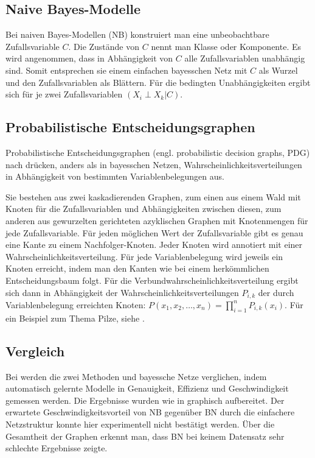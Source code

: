 \documentclass[a4paper,10pt,oneside]{scrartcl}
\begin{document}
\subsection*{Naive Bayes-Modelle}

Bei naiven Bayes-Modellen (NB) konstruiert man eine unbeobachtbare Zufallsvariable $C$. Die Zustände von $C$ nennt man Klasse oder Komponente. 
Es wird angenommen, dass in Abhängigkeit von $C$ alle Zufallsvariablen unabhängig sind. Somit entsprechen sie einem einfachen bayesschen Netz mit $C$ als Wurzel und den Zufallsvariablen als Blättern. Für die bedingten Unabhängigkeiten ergibt sich für je zwei Zufallsvariablen $(X_i \perp X_k | C)$. 

\subsection*{Probabilistische Entscheidungsgraphen}

Probabilistische Entscheidungsgraphen (engl. probabilistic decision graphs, PDG) nach \cite{bozga1999representation} drücken, anders als in bayesschen Netzen, Wahrscheinlichkeitsverteilungen in Abhängigkeit von bestimmten Variablenbelegungen aus.

Sie bestehen aus zwei kaskadierenden Graphen, zum einen aus einem Wald mit Knoten für die Zufallsvariablen und Abhängigkeiten zwischen diesen, zum anderen aus gewurzelten gerichteten azyklischen Graphen mit Knotenmengen für jede Zufallsvariable. Für jeden möglichen Wert der Zufallsvariable gibt es genau eine Kante zu einem Nachfolger-Knoten. Jeder Knoten wird annotiert mit einer Wahrscheinlichkeitsverteilung. Für jede Variablenbelegung wird jeweils ein Knoten erreicht, indem man den Kanten wie bei einem herkömmlichen Entscheidungsbaum folgt. Für die Verbundwahrscheinlichkeitsverteilung ergibt sich dann in Abhängigkeit der Wahrscheinlichkeitsverteilungen $P_{i,k}$ der durch Variablenbelegung erreichten Knoten:  $P(x_1,x_2,\dots,x_n) = \prod_{i=1}^n P_{i,k}(x_i) $. Für ein Beispiel zum Thema Pilze, siehe .



\subsection*{Vergleich}

Bei \cite{nielsen2006empirical} werden die zwei Methoden und bayessche Netze verglichen, indem automatisch gelernte Modelle in Genauigkeit, Effizienz und Geschwindigkeit gemessen werden. Die Ergebnisse wurden wie in  graphisch aufbereitet. Der erwartete Geschwindigkeitsvorteil von NB gegenüber BN durch die einfachere Netzstruktur konnte hier experimentell nicht bestätigt werden. Über die Gesamtheit der Graphen erkennt man, dass BN bei keinem Datensatz sehr schlechte Ergebnisse zeigte. 
\end{document}
